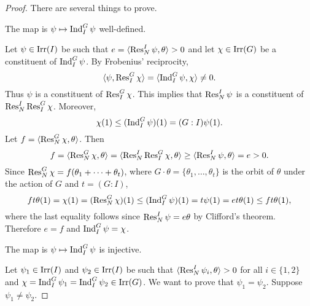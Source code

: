 \begin{proof}
    There are several things to prove. 

    \begin{claim}
        The map is $\psi\mapsto\operatorname{Ind}_I^G\psi$ well-defined. 
    \end{claim}

    Let $\psi\in\operatorname{Irr}(I)$ be such that $e=\langle\operatorname{Res}_N^I\psi,\theta\rangle>0$ and 
    let $\chi\in\operatorname{Irr}(G)$ be a constituent of $\operatorname{Ind}_I^G\psi$. By Frobenius' reciprocity, 
    \[
    \langle\psi,\operatorname{Res}_I^G\chi\rangle=\langle\operatorname{Ind}_I^G\psi,\chi\rangle\ne0.
    \]
    Thus $\psi$ is a constituent of $\operatorname{Res}_I^G\chi$. 
    This implies that 
    $\operatorname{Res}_N^I\psi$ is a constituent of $\operatorname{Res}_N^I\operatorname{Res}_I^G\chi$. 
    Moreover, 
    \[
    \chi(1)\leq(\operatorname{Ind}_I^G\psi)(1)=(G:I)\psi(1).
    \]
    Let $f=\langle\operatorname{Res}_N^G\chi,\theta\rangle$. Then  
    \[
    f=\langle\operatorname{Res}_N^G\chi,\theta\rangle=\langle\operatorname{Res}_N^I\operatorname{Res}_I^G\chi,\theta\rangle
    \geq\langle\operatorname{Res}_N^I\psi,\theta\rangle=e>0.
    \]
    Since $\operatorname{Res}_N^G\chi=f(\theta_1+\cdots+\theta_t)$, where $G\cdot\theta=\{\theta_1,\dots,\theta_t\}$ is 
    the orbit of $\theta$ under the action of $G$ and $t=(G:I)$,  
    \[
    ft\theta(1)=\chi(1)=(\operatorname{Res}_N^G\chi)(1)\leq(\operatorname{Ind}_I^G\psi)(1)=t\psi(1)=et\theta(1)\leq ft\theta(1),
    \]
    where the last equality follows since 
    $\operatorname{Res}_N^I\psi=e\theta$ by Clifford's theorem. Therefore $e=f$ and 
    $\operatorname{Ind}_I^G\psi=\chi$. 

    \begin{claim}
        The map is $\psi\mapsto\operatorname{Ind}_I^G\psi$ is injective. 
    \end{claim}

    Let $\psi_1\in\operatorname{Irr}(I)$ and $\psi_2\in\operatorname{Irr}(I)$ 
    be such that 
    $\langle\operatorname{Res}_N^I\psi_i,\theta\rangle>0$ for all $i\in\{1,2\}$ and 
    $\chi=\operatorname{Ind}_I^G\psi_1=\operatorname{Ind}_I^G\psi_2\in\operatorname{Irr}(G)$. We want to prove that $\psi_1=\psi_2$. Suppose $\psi_1\ne\psi_2$. 
    

\end{proof}
